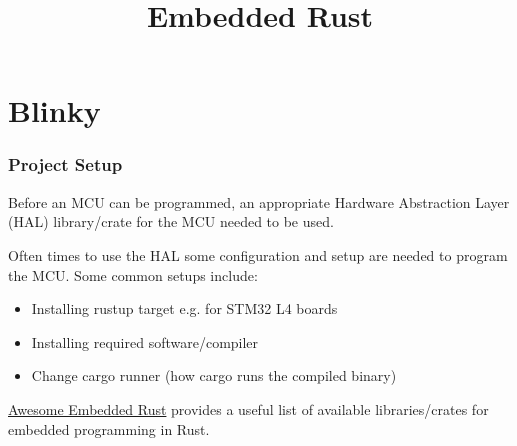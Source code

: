 \documentclass{beamer}
\title{Embedded Rust}
\begin{document}
\begin{frame}
  \titlepage{}
\end{frame}

\section{Blinky}
\begin{frame}
  \frametitle{Project Setup}
  Before an MCU can be programmed, an appropriate Hardware Abstraction Layer (HAL) library/crate for the MCU needed to be used.

  Often times to use the HAL some configuration and setup are needed to program the MCU. Some common setups include:

  \begin{itemize}
    \item{Installing rustup target e.g.  for STM32 L4 boards}
    \item{Installing required software/compiler}
    \item{Change cargo runner (how cargo runs the compiled binary)}
  \end{itemize}

  \href{https://github.com/rust-embedded/awesome-embedded-rust}{Awesome Embedded Rust} provides a useful list of available libraries/crates for embedded programming in Rust.
\end{frame}
\end{document}
